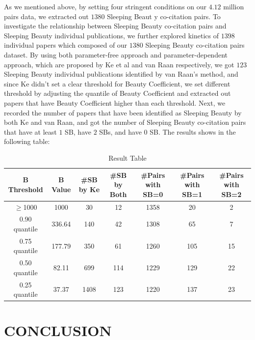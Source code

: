 \documentclass[utf8]{frontiersSCNS}
\begin{document}
As we mentioned above, by setting four stringent conditions on our $4.12$ million pairs data, we extracted out $1380$ Sleeping Beaut y co-citation pairs. To investigate the relationship between Sleeping Beauty co-citation pairs and Sleeping Beauty individual publications, we further explored kinetics of $1398$ individual papers which composed of our $1380$ Sleeping Beauty co-citation pairs dataset. By using both parameter-free approach and parameter-dependent approach, which are proposed by Ke et al and van Raan respectively, we got $123$ Sleeping Beauty individual publications identified by van Raan's method, and since Ke didn't set a clear threshold for Beauty Coefficient, we set different threshold by adjusting the quantile of Beauty Coefficient and extracted out papers that have Beauty Coefficient higher than each threshold. Next, we recorded the number of papers that have been identified as Sleeping Beauty by both Ke and van Raan, and got the number of Sleeping Beauty co-citation pairs that have at least $1$ SB, have $2$ SBs, and have $0$ SB. The results shows in the following table:
\begin{table}[ht]
\caption{Result Table} %
\centering %
\begin{center}
\begin{tabular}{c c c c c c c} %
B Threshold & B Value & \#SB by Ke & \#SB by Both & \#Pairs with SB=0 & \#Pairs with SB=1 & \#Pairs with SB=2 \\ [0.5ex] %
\hline %
$\geq$1000 & 1000 & 30 & 12 & 1358 & 20 & 2 \\ %
0.90 quantile & 336.64 &140 & 42 & 1308 & 65 & 7 \\
0.75 quantile & 177.79 & 350 & 61 & 1260 & 105 & 15 \\
0.50 quantile & 82.11 & 699 & 114 & 1229 & 129 & 22 \\
0.25 quantile & 37.37 & 1408 & 123 & 1220 & 137 & 23 \\ [1ex] %
\hline %
\end{tabular}
\end{center}
\label{table:nonlin} %
\end{table}


\section{CONCLUSION}
\end{document}

